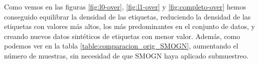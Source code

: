 Como vemos en las figuras \ref{fig:l0-over}, \ref{fig:l1-over} y \ref{fig:completo-over} hemos conseguido equilibrar la densidad de las etiquetas, reduciendo la densidad de las etiquetas con valores más altos, los más predominantes en el conjunto de datos, y creando nuevos datos sintéticos de etiquetas con menor valor. Además, como podemos ver en la tabla \ref{table:comparacion_orig_SMOGN}, aumentando el número de muestras, sin necesidad de que SMOGN haya aplicado submuestreo.
